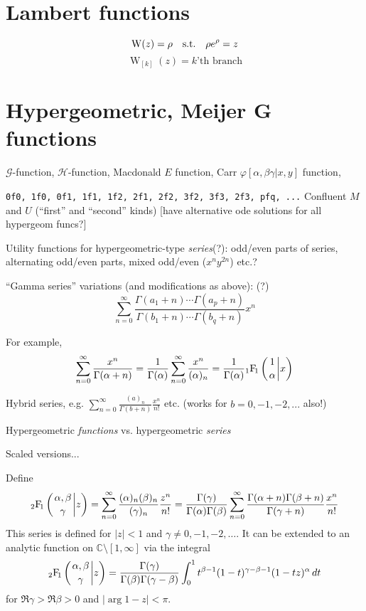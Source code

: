 \documentclass[10pt,dvipdfmx,letterpaper,twoside]{article}
\let\O=\operatorname
\newcommand{\CC}{{\mathbb{C}}}
\newcommand{\Hyper}[5]{{\mathop{{}_{#1}\!\O{F\!}_{#2}\left({\genfrac{}{}{0pt}{}{#3}{#4}}\middle|{#5}\right)}}}
\let\al=\alpha
\let\gam=\gamma
\let\Gam=\Gamma
\let\phi=\varphi
\begin{document}
\section{Lambert functions}
\[ \O{W}(z) = \rho \text{\quad s.t.\quad} \rho e^\rho = z \]
\[ \O{W}_{[k]}(z) = \text{$k$'th branch} \]

\section{Hypergeometric, Meijer G functions}
$\mathcal{G}$-function, $\mathcal{H}$-function, Macdonald $E$ function, Carr $\phi[\al,\beta\gam|x,y]$ function,

{\tt 0f0, 1f0, 0f1, 1f1, 1f2, 2f1, 2f2, 3f2, 3f3, 2f3, pfq, ...}
Confluent $M$ and $U$ (``first'' and ``second'' kinds) [have alternative ode solutions for all hypergeom funcs?]

Utility functions for hypergeometric-type {\em series}(?): odd/even parts of series, alternating odd/even parts, 
mixed odd/even ($x^n y^{2n}$) etc.?

``Gamma series'' variations (and modifications as above): (?)
\[ \sum_{n=0}^\infty \frac{\Gam(a_1+n)\cdots\Gam(a_p+n)}{\Gam(b_1+n)\cdots\Gam(b_q+n)} x^n \]

For example,
\[ \sum_{n=0}^\infty\frac{x^n}{\Gam(\al+n)} = \frac{1}{\Gam(\al)}\sum_{n=0}^\infty\frac{x^n}{(\al)_n}
    = \frac{1}{\Gam(\al)} \Hyper{1}{1}{1}{\al}{x} \]

Hybrid series, e.g. $\sum_{n=0}^\infty \frac{(a)_n}{\Gam(b+n)}\frac{x^n}{n!}$ etc. (works for $b=0,-1,-2,...$ also!)

Hypergeometric {\em functions} vs. hypergeometric {\em series}

Scaled versions...

Define
\[ \Hyper{2}{1}{\al, \beta}{\gam}{z} = \sum_{n=0}^\infty \frac{(\al)_n (\beta)_n}{(\gam)_n} \frac{z^n}{n!}
    = \frac{\Gam(\gam)}{\Gam(\al)\Gam(\beta)}\sum_{n=0}^\infty \frac{\Gam(\al+n)\Gam(\beta+n)}{\Gam(\gam+n)} \frac{x^n}{n!} \]
This series is defined for $|z|<1$ and $\gam\neq0,-1,-2,\dots$.  It can be extended to an analytic function
on $\CC\setminus[1,\infty]$ via the integral
\[ \Hyper{2}{1}{\al, \beta}{\gam}{z} = \frac{\Gam(\gam)}{\Gam(\beta)\Gam(\gam-\beta)}\int_0^1 t^{\beta-1}(1-t)^{\gam-\beta-1}(1-tz)^{\al}\,dt \]
for $\Re\gam>\Re\beta>0$ and $|\arg 1-z|<\pi$.
\end{document}
